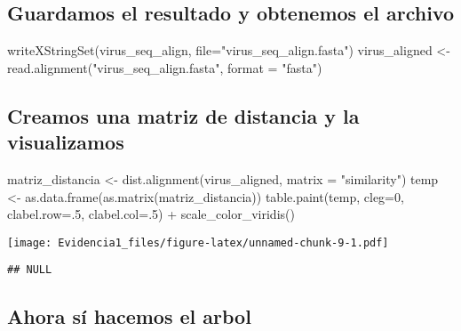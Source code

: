 \documentclass[
]{article}
\newenvironment{Shaded}{\begin{snugshade}}{\end{snugshade}}
\newcommand{\AttributeTok}[1]{\textcolor[rgb]{0.77,0.63,0.00}{#1}}
\newcommand{\DecValTok}[1]{\textcolor[rgb]{0.00,0.00,0.81}{#1}}
\newcommand{\FunctionTok}[1]{\textcolor[rgb]{0.00,0.00,0.00}{#1}}
\newcommand{\NormalTok}[1]{#1}
\newcommand{\OtherTok}[1]{\textcolor[rgb]{0.56,0.35,0.01}{#1}}
\newcommand{\SpecialCharTok}[1]{\textcolor[rgb]{0.00,0.00,0.00}{#1}}
\newcommand{\StringTok}[1]{\textcolor[rgb]{0.31,0.60,0.02}{#1}}
\begin{document}
\hypertarget{guardamos-el-resultado-y-obtenemos-el-archivo}{%
\subsection{Guardamos el resultado y obtenemos el
archivo}\label{guardamos-el-resultado-y-obtenemos-el-archivo}}

\begin{Shaded}
\begin{Highlighting}[]
\FunctionTok{writeXStringSet}\NormalTok{(virus\_seq\_align, }\AttributeTok{file=}\StringTok{"virus\_seq\_align.fasta"}\NormalTok{)}
\NormalTok{virus\_aligned }\OtherTok{\textless{}{-}} \FunctionTok{read.alignment}\NormalTok{(}\StringTok{"virus\_seq\_align.fasta"}\NormalTok{, }\AttributeTok{format =} \StringTok{"fasta"}\NormalTok{)}
\end{Highlighting}
\end{Shaded}

\hypertarget{creamos-una-matriz-de-distancia-y-la-visualizamos}{%
\subsection{Creamos una matriz de distancia y la
visualizamos}\label{creamos-una-matriz-de-distancia-y-la-visualizamos}}

\begin{Shaded}
\begin{Highlighting}[]
\NormalTok{matriz\_distancia }\OtherTok{\textless{}{-}} \FunctionTok{dist.alignment}\NormalTok{(virus\_aligned, }\AttributeTok{matrix =} \StringTok{"similarity"}\NormalTok{)}
\NormalTok{temp }\OtherTok{\textless{}{-}} \FunctionTok{as.data.frame}\NormalTok{(}\FunctionTok{as.matrix}\NormalTok{(matriz\_distancia))}
\FunctionTok{table.paint}\NormalTok{(temp, }\AttributeTok{cleg=}\DecValTok{0}\NormalTok{, }\AttributeTok{clabel.row=}\NormalTok{.}\DecValTok{5}\NormalTok{, }\AttributeTok{clabel.col=}\NormalTok{.}\DecValTok{5}\NormalTok{) }\SpecialCharTok{+} \FunctionTok{scale\_color\_viridis}\NormalTok{()}
\end{Highlighting}
\end{Shaded}

\texttt{[image: Evidencia1\_files/figure-latex/unnamed-chunk-9-1.pdf]}

\begin{verbatim}
## NULL
\end{verbatim}

\hypertarget{ahora-suxed-hacemos-el-arbol}{%
\subsection{Ahora sí hacemos el
arbol}\label{ahora-suxed-hacemos-el-arbol}}
\end{document}
